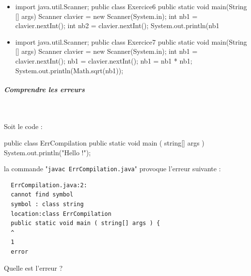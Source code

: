 \documentclass[11pt,a4paper]{article}
\begin{document}
\begin{itemize}
			\item \begin{Java}
import java.util.Scanner;
public class Exercice6 {
    public static void main(String [] args) {
        Scanner clavier = new Scanner(System.in);
        int nb1 = clavier.nextInt();
        int nb2 = clavier.nextInt();
        System.out.println(nb1%
    }
}
        \end{Java} \textcolor{gray}{\underline{\hspace*{1em}}} 
			\item \begin{Java}
import java.util.Scanner;
public class Exercice7 {
    public static void main(String [] args) {
        Scanner clavier = new Scanner(System.in);
        int nb1 = clavier.nextInt();
        nb1 = clavier.nextInt();
        nb1 = nb1 * nb1;
        System.out.println(Math.sqrt(nb1));
    }
}
        \end{Java} \textcolor{gray}{\underline{\hspace*{1em}}} 
					\end{itemize}
				
            \par
        
			
		\subparagraph{Comprendre les erreurs} 
		
                \textcolor{white}{.} \par
            
								Soit le code :
							
            \par
        \begin{Java}
  public class ErrCompilation{
	  public static void main ( string[] args ) {
		  System.out.println("Hello !");
	  }
  }							\end{Java}
								la commande "\verb|javac ErrCompilation.java|"  provoque l'erreur suivante :
							
            \par
        \begin{verbatim}
  ErrCompilation.java:2:
  cannot find symbol
  symbol : class string
  location:class ErrCompilation
  public static void main ( string[] args ) {
  ^ 
  1
  error						\end{verbatim}
								Quelle est l'erreur ?
							
            \par
        
\end{document}
